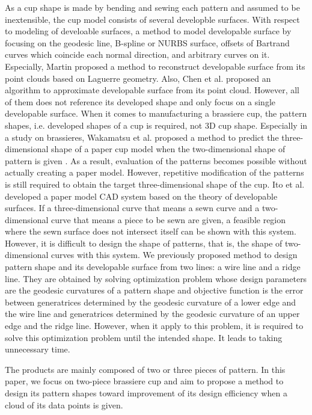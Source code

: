 \documentclass[E]{scitrans}
\begin{document}
As a cup shape is made by bending and sewing each pattern and assumed to be inextensible, the cup model consists of several developble surfaces.
With respect to modeling of develoable surfaces, a method to model developable surface by focusing on the geodesic line\cite{c2}, B-spline or NURBS surface\cite{c3,c4}, offsets of Bartrand curves which coincide each normal direction\cite{c5,c6}, and arbitrary curves on it\cite{c7}. Especially, Martin proposed a method to reconstruct developable surface from its point clouds based on Laguerre geometry\cite{c8}. Also, Chen et al. proposed an algorithm to approximate developable surface from its point cloud\cite{c9}. However, all of them does not reference its developed shape and only focus on a single developable surface. When it comes to manufacturing a brassiere cup, the pattern shapes, i.e. developed shapes of a cup is required, not 3D cup shape. Especially in a study on brassieres, Wakamatsu et al. proposed a method to predict the three-dimensional shape of a paper cup model when the two-dimensional shape of pattern is given \cite{c10,c11}. As a result, evaluation of the patterns becomes possible without actually creating a paper model. However, repetitive modification of the patterns is still required to obtain the target three-dimensional shape of the cup.
Ito et al. developed a paper model CAD system based on the theory of developable surfaces\cite{c12}. If a three-dimensional curve that means a sewn curve and a two-dimensional curve that means a piece to be sewn are given, a feasible region where the sewn surface does not intersect itself can be shown with this system. However, it is difficult to design the shape of patterns, that is, the shape of two-dimensional curves with this system.
We previously proposed method to design pattern shape and its developable surface from two lines: a wire line and a ridge line. They are obtained by solving optimization problem whose design parameters are the geodesic curvatures of a pattern shape and objective function is the error between generatrices determined by the geodesic curvature of a lower edge and the wire line and generatrices determined by the geodesic curvature of an upper edge and the ridge line. However, when it apply to this problem, it is required to  solve this optimization problem until the intended shape\cite{MyRef}. It leads to taking unnecessary time.


The products are mainly composed of two or three pieces of pattern. In this paper, we focus on two-piece brassiere cup and aim to propose a method to design its pattern shapes toward improvement of its design efficiency when a cloud of its data points is given.
\end{document}
